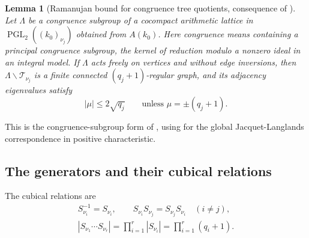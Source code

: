 \documentclass[11pt,letterpaper]{article}
\renewcommand{\le}{\leqslant}
\newtheorem{lemma}[theorem]{Lemma}
\theoremstyle{definition}
\theoremstyle{remark}
\newcommand{\PGL}{\operatorname{PGL}}
\begin{document}
\begin{lemma}[Ramanujan bound for congruence tree quotients,
consequence of {\cite[Theorem~1.2, $d=2$]{LSV2005}}]
\label{lem:arithmetic-ramanujan}
Let $\Lambda$ be a congruence subgroup of a cocompact arithmetic
lattice in $\PGL_2((k_0)_{\nu_j})$ obtained from $A(k_0)$.
Here congruence means containing a principal congruence subgroup,
the kernel of reduction modulo a nonzero ideal in an integral model.
If $\Lambda$ acts freely on vertices and without edge inversions,
then $\Lambda\backslash\mathcal T_{\nu_j}$ is a finite connected
$(q_j+1)$-regular graph, and its adjacency eigenvalues satisfy
\[
 |\mu|\le 2\sqrt{q_j}
 \qquad\text{unless }\mu=\pm(q_j+1).
\]
\end{lemma}
This is the congruence-subgroup form of
\cite[Theorem~1.2, $d=2$]{LSV2005}, using
\cite[Theorem~3.2]{BadulescuRoche2013} for the global
Jacquet-Langlands correspondence in positive characteristic.


\subsection{The generators and their cubical relations}
\label{sec:cubical-generator-proof}
The cubical relations are
\begin{equation}
 \begin{gathered}
 S_{\nu_i}^{-1}=S_{\nu_i},\qquad
 S_{\nu_i}S_{\nu_j}=S_{\nu_j}S_{\nu_i}\quad(i\ne j),\\
 |S_{\nu_1}\cdots S_{\nu_r}|=
 \prod_{i=1}^r|S_{\nu_i}|=\prod_{i=1}^r(q_i+1).
 \end{gathered}
 \label{eq:unique-refactorization}
\end{equation}
\end{document}
